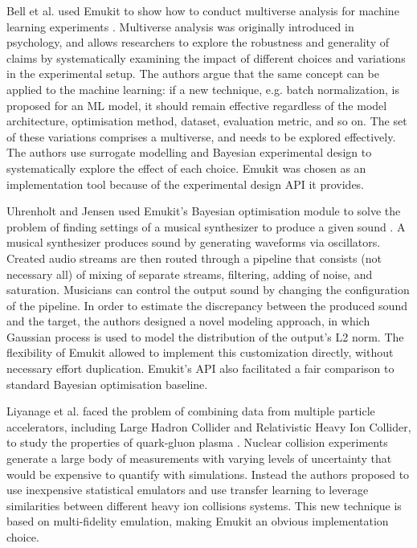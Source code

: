 Bell et al. used Emukit to show how to conduct multiverse analysis for machine learning experiments \cite{bell2022modeling}. Multiverse analysis was originally introduced in psychology, and allows researchers to explore the robustness and generality of claims by systematically examining the impact of different choices and variations in the experimental setup. The authors argue that the same concept can be applied to the machine learning: if a new technique, e.g. batch normalization, is proposed for an ML model, it should remain effective regardless of the model architecture, optimisation method, dataset, evaluation metric, and so on. The set of these variations comprises a multiverse, and needs to be explored effectively. The authors use surrogate modelling and Bayesian experimental design to systematically explore the effect of each choice. Emukit was chosen as an implementation tool because of the experimental design API it provides.

Uhrenholt and Jensen used Emukit's Bayesian optimisation module to solve the problem of finding settings of a musical synthesizer to produce a given sound \cite{uhrenholt2019efficient}. A musical synthesizer produces sound by generating waveforms via oscillators. Created audio streams are then routed through a pipeline that consists (not necessary all) of mixing of separate streams, filtering, adding of noise, and saturation. Musicians can control the output sound by changing the configuration of the pipeline. In order to estimate the discrepancy between the produced sound and the target, the authors designed a novel modeling approach, in which Gaussian process is used to model the distribution of the output's L2 norm. The flexibility of Emukit allowed to implement this customization directly, without necessary effort duplication. Emukit's API also facilitated a fair comparison to standard Bayesian optimisation baseline.

Liyanage et al. faced the problem of combining data from multiple particle accelerators, including Large Hadron Collider and Relativistic Heavy Ion Collider, to study the properties of quark-gluon plasma \cite{PhysRevC105034910}. Nuclear collision experiments generate a large body of measurements with varying levels of uncertainty that would be expensive to quantify with simulations. Instead the authors proposed to use inexpensive statistical emulators and use transfer learning to leverage similarities between different heavy ion collisions systems. This new technique is based on multi-fidelity emulation, making Emukit an obvious implementation choice.

